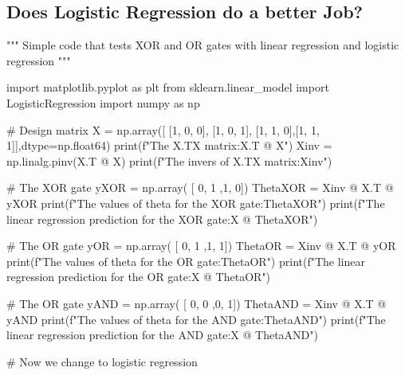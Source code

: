 \documentclass[%
oneside,                 %
final,                   %
10pt]{article}
\begin{document}
\subsection{Does Logistic Regression do a better Job?}



















































\bpycod
"""
Simple code that tests XOR and OR gates with linear regression
and logistic regression
"""

import matplotlib.pyplot as plt
from sklearn.linear_model import LogisticRegression
import numpy as np

# Design matrix
X = np.array([ [1, 0, 0], [1, 0, 1], [1, 1, 0],[1, 1, 1]],dtype=np.float64)
print(f"The X.TX  matrix:{X.T @ X}")
Xinv = np.linalg.pinv(X.T @ X)
print(f"The invers of X.TX  matrix:{Xinv}")

# The XOR gate 
yXOR = np.array( [ 0, 1 ,1, 0])
ThetaXOR  = Xinv @ X.T @ yXOR
print(f"The values of theta for the XOR gate:{ThetaXOR}")
print(f"The linear regression prediction  for the XOR gate:{X @ ThetaXOR}")


# The OR gate 
yOR = np.array( [ 0, 1 ,1, 1])
ThetaOR  = Xinv @ X.T @ yOR
print(f"The values of theta for the OR gate:{ThetaOR}")
print(f"The linear regression prediction  for the OR gate:{X @ ThetaOR}")


# The OR gate 
yAND = np.array( [ 0, 0 ,0, 1])
ThetaAND  = Xinv @ X.T @ yAND
print(f"The values of theta for the AND gate:{ThetaAND}")
print(f"The linear regression prediction  for the AND gate:{X @ ThetaAND}")

# Now we change to logistic regression
\end{document}
